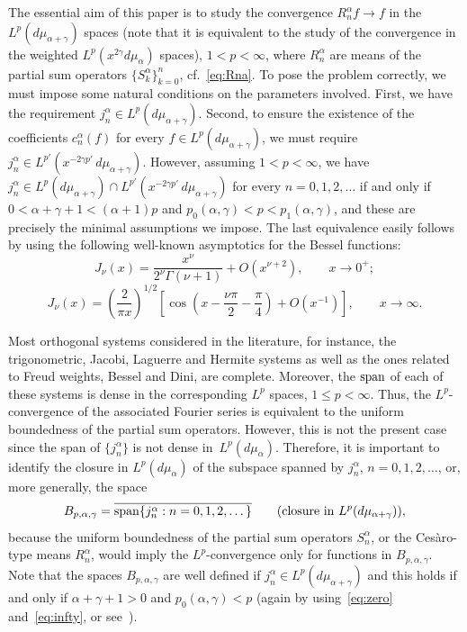\documentclass[a4paper]{amsart}
\newcommand{\spa}{\operatornamewithlimits{span}}
\newcommand{\mua}{d\mu_\alpha}
\newcommand{\muag}{d\mu_{\alpha+\gamma}}
\begin{document}
The essential aim of this paper is to study the convergence $R_n^\alpha f\to f$
in the $L^p(\muag)$ spaces (note that it is equivalent to the
study of the convergence in the weighted $L^p(x^{2\gamma}\mua)$ spaces),
$1<p<\infty$, where $R_n^\alpha$ are means of the partial sum operators
$\{S_k^\alpha\}_{k=0}^n$, cf.~\eqref{eq:Rna}.
To pose the problem correctly, we must impose some natural conditions on the
parameters involved. First, we have the requirement $j_n^\alpha\in L^p(\muag)$.
Second, to ensure the existence of the coefficients $c_n^\alpha(f)$ for every
$f \in L^p({\muag})$, we must require
$j_n^\alpha \in L^{p'}(x^{-2\gamma p'}\,\muag)$.
However, assuming $1<p<\infty$, we have
$j_n^\alpha\in L^p(\muag)\cap L^{p'}(x^{-2\gamma p'}\,\muag)$
for every $n=0,1,2,\dots$ if and only if
$0 < \alpha+\gamma+1 < (\alpha+1)p$ and
$p_0(\alpha,\gamma) < p < p_1(\alpha,\gamma)$,
and these are precisely the minimal assumptions we impose.
The last equivalence easily follows by using the following
well-known asymptotics for the Bessel functions:
\begin{equation}
\label{eq:zero}
  J_\nu(x) = \frac{x^\nu}{2^\nu \Gamma(\nu+1)} + O(x^{\nu+2}),
    \qquad x \to 0^+;
\end{equation}
\begin{equation}
\label{eq:infty}
  J_\nu(x)=\left(\frac{2}{\pi x}\right)^{1/2}\left[ \cos\left(x-\frac{\nu\pi}2
    - \frac\pi4 \right) + O(x^{-1}) \right], \qquad x \to \infty.
\end{equation}

Most orthogonal systems considered in the literature, for instance, the
trigonometric, Jacobi, Laguerre and Hermite systems as well as the ones
related to Freud weights, Bessel and Dini, are complete. Moreover, the
$\spa$ of each of these systems is dense in the corresponding $L^p$ spaces,
$1\le p<\infty$.
Thus, the $L^p$-convergence of the associated Fourier series is equivalent
to the uniform boundedness of the partial sum operators.
However, this is not the present case since the span of $\{j^\alpha_n\}$ is not
dense in~$L^p(\mua)$.
Therefore, it is important to identify the closure in $L^p(\mua)$
of the subspace spanned by $j_n^\alpha$, $n = 0,1,2,\dots$,
or, more generally, the space
\begin{equation*}
  B_{p,\alpha,\gamma} = \overline{\spa \{j_n^\alpha : n = 0,1,2,\dots\}}
  \qquad (\text{closure in } L^p(\muag)),
\end{equation*}
because the uniform boundedness of the partial sum operators $S_n^\alpha$,
or the Ces\`aro-type means $R_n^\alpha$, would imply the $L^p$-convergence
only for functions in $B_{p,\alpha,\gamma}$. Note
that the spaces $B_{p,\alpha,\gamma}$ are well defined if
$j_n^\alpha\in L^p(\muag)$ and this holds if and only if
$\alpha+\gamma+1>0$ and $p_0(\alpha,\gamma)<p$ (again by using~\eqref{eq:zero}
and~\eqref{eq:infty}, or see~\cite{Ci}).
\end{document}
